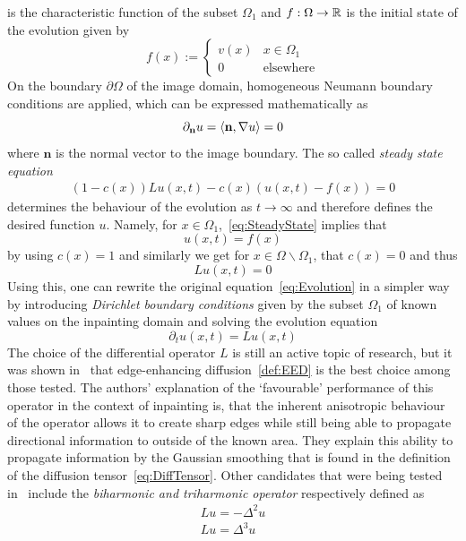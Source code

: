 is the characteristic function of the subset $\Omega_1$ and $f:\Omega\rightarrow\mathbb{R}$ is the
initial state of the evolution given by
\begin{equation} 
    f(x) := \begin{cases}
        v(x)&x\in\Omega_1\\
        0&\text{elsewhere}
    \end{cases} 
\end{equation}
On the boundary $\partial\Omega$ of the image domain, homogeneous Neumann boundary conditions are
applied, which can be expressed mathematically as 
\begin{equation*}
    \partial_\mathbf{n}u = \langle \mathbf{n}, \mathbf{\nabla} u \rangle = 0
\end{equation*}
where $ \mathbf{n}$ is the normal vector to the image boundary.
The so called \textit{steady state equation}
\begin{align}
    (1 - c(x))Lu(x,t)- c(x)(u(x, t) - f(x)) = 0\label{eq:SteadyState}
\end{align}
determines the behaviour of the evolution as $t\to\infty$ and therefore defines the desired
function $u$. Namely, for $x\in\Omega_1$,~\eqref{eq:SteadyState} implies that 
\[ u(x,t) = f(x) \]
by using $c(x) = 1$ and similarly we get for $x\in\Omega\backslash\Omega_1$, that $c(x) = 0$ and
thus
\[ Lu(x, t) = 0 \]
Using this, one can rewrite the original equation~\eqref{eq:Evolution} in a simpler way by
introducing \textit{Dirichlet boundary conditions} given by the subset $\Omega_1$ of known values on the 
inpainting domain and solving the evolution equation
\begin{equation}
    \partial_t u(x,t) = Lu(x, t)
\end{equation}
The choice of the differential operator $L$ is still an active topic of
research, but it was shown in~\cite{schmaltz14} that edge-enhancing diffusion~\eqref{def:EED} is the best choice
among those tested.
The authors' explanation of the `favourable' performance of this operator in the context of
inpainting is, that the inherent anisotropic behaviour of the operator allows it to create sharp
edges while still being able to propagate directional information to outside of the known area.
They explain this ability to propagate information by the Gaussian smoothing that is found in the
definition of the diffusion tensor~\eqref{eq:DiffTensor}.
Other candidates that were being tested in~\cite{schmaltz14} include the \textit{biharmonic
and triharmonic operator} respectively defined as
\begin{eqnarray*}
    Lu = -\Delta^2u\\
    Lu = \Delta^3u
\end{eqnarray*}
